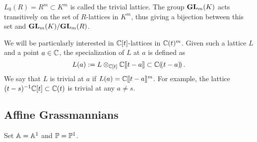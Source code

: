 \documentclass[draft]{article}
\begin{document}
$L_0(R) = R^m \subset K^m $ is called the trivial lattice. The group $\GL_m(K) $ acts transitively on the set of $R$-lattices in $K^m$, thus giving a bijection between 
this set and $\GL_m(K)/\GL_m(R)$.

We will be particularly interested in $\CC[t]$-lattices in $ \CC(t)^m$.  Given such a lattice $ L $ and a point $ a \in \CC$, the specialization of $ L $ at $ a $ is defined as
$$
L(a) := L \otimes_{\CC[t]} \CC\xt[t-a] \subset \CC\xT[t-a]\,.
$$
We say that $ L $ is trivial at $ a $ if $ L(a) = \CC\xt[t-a]^m$. For example, the lattice $(t-s)^{-1}\CC[t] \subset \CC(t)$ is trivial at any $a\ne s$. 





\subsection{Affine Grassmannians} %

Set $\AA = \AA^1$ and $\PP = \PP^1$. 
\end{document}
